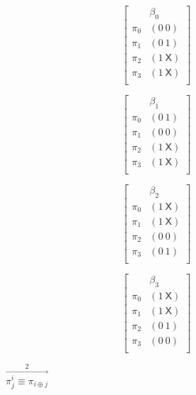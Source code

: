 \begin{figure}[h]
\parbox{0.2\textwidth}{
$$ \left[
  \begin{array}{c|c}
          & \beta_0 \\ \hline
    \pi_0 & (0~0) \\
    \pi_1 & (0~1) \\
    \pi_2 & (1~\textsf{X}) \\
    \pi_3 & (1~\textsf{X}) \\
  \end{array}
\right]
$$
}\parbox{0.2\textwidth}{
$$ \left[
  \begin{array}{c|c}
          & \beta_1 \\ \hline
    \pi_0 & (0~1) \\
    \pi_1 & (0~0) \\
    \pi_2 & (1~\textsf{X}) \\
    \pi_3 & (1~\textsf{X}) \\
  \end{array}
\right]
$$
}\parbox{0.2\textwidth}{
$$ \left[
  \begin{array}{c|c}
          & \beta_2 \\ \hline
    \pi_0 & (1~\textsf{X}) \\
    \pi_1 & (1~\textsf{X}) \\
    \pi_2 & (0~0) \\
    \pi_3 & (0~1) \\
  \end{array}
\right]
$$
}\parbox{0.2\textwidth}{
$$ \left[
  \begin{array}{c|c}
          & \beta_3 \\ \hline
    \pi_0 & (1~\textsf{X}) \\
    \pi_1 & (1~\textsf{X}) \\
    \pi_2 & (0~1) \\
    \pi_3 & (0~0) \\
  \end{array}
\right]
$$
} $\stackrel{2}{\stackrel{\longrightarrow}{\pi^i_j \equiv \pi_{i
\oplus j}}}$


\end{figure}
